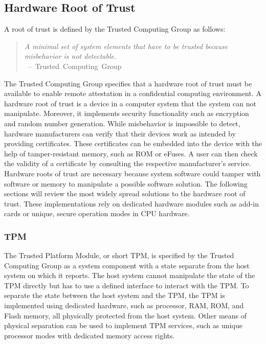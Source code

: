 
\subsection{Hardware Root of Trust}
\label{sec:20:hardware_root_of_trust}
A root of trust is defined by the Trusted Computing Group as follows:
\begin{quote}
    \textit{ A minimal set of system elements that have to be trusted because
        misbehavior is not detectable. \\
    }
    \mbox{ -- Trusted Computing Group\cite{tpm_architecture}}
\end{quote}

The Trusted Computing Group specifies that a hardware root of trust must be
available to enable remote attestation in a confidential computing
environment.\cite{tpm_architecture} A hardware root of trust is a device in a
computer system that the system can not manipulate. Moreover, it implements
security functionality such as encryption and random number generation. While
misbehavior is impossible to detect, hardware manufacturers can verify that
their devices work as intended by providing certificates. These certificates can
be embedded into the device with the help of tamper-resistant memory, such as
ROM or eFuses. A user can then check the validity of a certificate by consulting
the respective manufacturer's service. \\

Hardware roots of trust are necessary because system software could tamper with
software or memory to manipulate a possible software solution. The following
sections will review the most widely spread solutions to the hardware root of
trust. These implementations rely on dedicated hardware modules such as add-in
cards or unique, secure operation modes in CPU hardware. \\

\subsubsection{TPM}
\label{sec:20:tpm}
The Trusted Platform Module, or short TPM, is specified by the Trusted Computing
Group as a system component with a state separate from the host system on which
it reports.\cite{tpm_architecture} The host system cannot manipulate the state
of the TPM directly but has to use a defined interface to interact with the TPM.
To separate the state between the host system and the TPM, the TPM is
implemented using dedicated hardware, such as processor, RAM, ROM, and Flash
memory, all physically protected from the host system. Other means of physical
separation can be used to implement TPM services, such as unique processor modes
with dedicated memory access rights. \\

